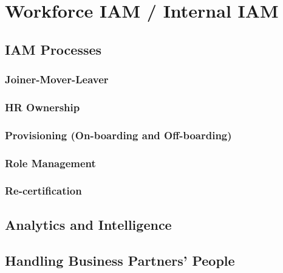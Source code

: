 \hypertarget{workforce-iam-internal-iam}{%
\chapter{Workforce IAM / Internal
IAM}\label{workforce-iam-internal-iam}}

\hypertarget{iam-processes}{%
\section{IAM Processes}\label{iam-processes}}

\hypertarget{joiner-mover-leaver}{%
\subsection{Joiner-Mover-Leaver}\label{joiner-mover-leaver}}

\hypertarget{hr-ownership}{%
\subsection{HR Ownership}\label{hr-ownership}}

\hypertarget{provisioning-on-boarding-and-off-boarding}{%
\subsection{Provisioning (On-boarding and
Off-boarding)}\label{provisioning-on-boarding-and-off-boarding}}

\hypertarget{role-management}{%
\subsection{Role Management}\label{role-management}}

\hypertarget{re-certification}{%
\subsection{Re-certification}\label{re-certification}}

\hypertarget{analytics-and-intelligence}{%
\section{Analytics and
Intelligence}\label{analytics-and-intelligence}}

\hypertarget{handling-business-partners-people}{%
\section{Handling Business Partners'
People}\label{handling-business-partners-people}}


